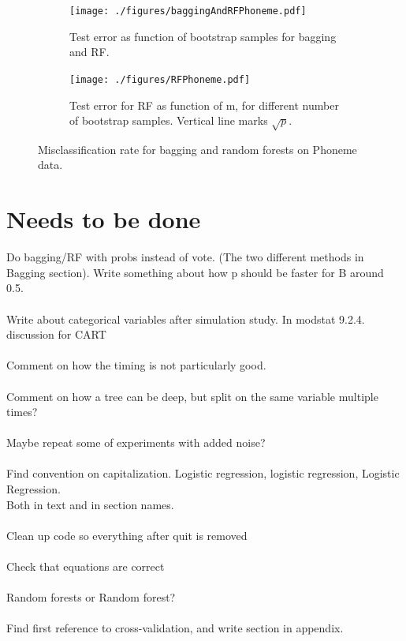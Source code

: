 \begin{figure}[h!]
  \centering
  \begin{subfigure}[b]{0.48\textwidth}
    \texttt{[image: ./figures/baggingAndRFPhoneme.pdf]}
    \caption{Test error as function of bootstrap samples for bagging and RF.}
    \label{fig:baggingAndRFPhoneme}
  \end{subfigure}%
  \quad
  \begin{subfigure}[b]{0.48\textwidth}
    \texttt{[image: ./figures/RFPhoneme.pdf]}
    \caption{Test error for RF as function of m, for different number of bootstrap samples. Vertical line marks $\sqrt{p}$.}
    \label{fig:RFPhoneme}
  \end{subfigure}
  \vspace{1\baselineskip}
  \caption{Misclassification rate for bagging and random forests on Phoneme data.}
  \label{fig:baggAndRFPhoneme}
\end{figure}


\clearpage
\section{Needs to be done}
\label{sec:Needs to be done}
Do bagging/RF with probs instead of vote. (The two different methods in Bagging section). Write something about how p should be faster for B around 0.5.\\
\\
Write about categorical variables after simulation study. In modstat 9.2.4. discussion for CART\\
\\
Comment on how the timing is not particularly good. \\
\\
Comment on how a tree can be deep, but split on the same variable multiple times?\\
\\
Maybe repeat some of experiments with added noise?\\
\\
Find convention on capitalization. Logistic regression, logistic regression, Logistic Regression. \\
Both in text and in section names.\\
\\
Clean up code so everything after quit is removed\\
\\
Check that equations are correct\\
\\
Random forests or Random forest? \\
\\
Find first reference to cross-validation, and write section in appendix.\\
\\



